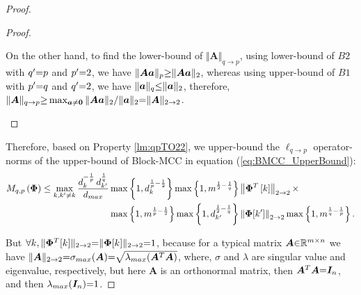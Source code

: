 \begin{proof}
\begin{proof}
\begin{itemize}
On the other hand, to find the lower-bound of $\Vert \boldsymbol{A}\Vert_{q \to p}$, using lower-bound of $B2$ with $q' {=} p$ and $p' {=} 2$, we have $\Vert \boldsymbol{Aa}\Vert_p {\geq} \Vert \boldsymbol{Aa}\Vert_2$, whereas using upper-bound of $B1$ with $p' {=} q$ and $q' {=} 2$, we have $\Vert \boldsymbol{a}\Vert_q {\leq} \Vert \boldsymbol{a}\Vert_2$, therefore, $\Vert \boldsymbol{A}\Vert_{q \to p} {\geq} \max_{\boldsymbol{a} \neq \boldsymbol{0}}  \Vert \boldsymbol{Aa}\Vert_2 {/} \Vert \boldsymbol{a}\Vert_2 {=} \Vert \boldsymbol{A}\Vert_{2 \to 2}$.
\end{itemize} 
\end{proof}
\fi
Therefore, based on Property \ref{lm:qpTO22}, we upper-bound the $\ell_{q {\to} p}$ operator-norms of the upper-bound of Block-MCC in equation (\ref{eq:BMCC_UpperBound}):
\begin{gather}
\label{eq:BMCC-UB} 
\begin{aligned} 
M_{q,p}\left( \boldsymbol{\Phi} \right) \leq 
\max_{k,k' \neq k} \frac{d_{k}^{-\frac1p} \, d_{k'}^{\frac1q}}{d_{max}} 
&\max \left\lbrace 1 , d_{k}^{\frac1p - \frac{1}{2}} \right\rbrace \max \left\lbrace 1 , m^{\frac{1}{2} - \frac1q} \right\rbrace \left\lVert\boldsymbol{\Phi}^T \left[ k \right]\right\rVert_{2 \to 2} \times\\ 
&\max \left\lbrace 1 , m^{\frac1p - \frac{1}{2}} \right\rbrace \max \left\lbrace 1 , d_{k'}^{\frac{1}{2} - \frac1q} \right\rbrace \left\lVert\boldsymbol{\Phi}[k']\right\rVert_{2 \to 2} 
\max \left\lbrace 1 , m^{\frac1q - \frac1p} \right\rbrace.
\end{aligned}
\end{gather}

But $\forall k, \Vert \boldsymbol{\Phi}^T [k] \Vert_{2 {\to} 2} {=} \Vert \boldsymbol{\Phi}[k] \Vert_{2 {\to} 2} {=} 1$, because for a typical matrix $\boldsymbol{A} {\in} \mathbb{R}^{m {\times} n}$ we have $\Vert \boldsymbol{A} \Vert_{2 {\to} 2} {=} \sigma_{max}(\boldsymbol{A}) {=} \sqrt{\lambda_{max}(\boldsymbol{A}^T \boldsymbol{A})}$, where, $\sigma$ and $\lambda$ are singular value and eigenvalue, respectively, but here $\boldsymbol{A}$ is an  orthonormal matrix, then $\boldsymbol{A}^T \boldsymbol{A} {=} \boldsymbol{I}_n$, and then $\lambda_{max}(\boldsymbol{I}_n) {=} 1$.


\end{proof}
